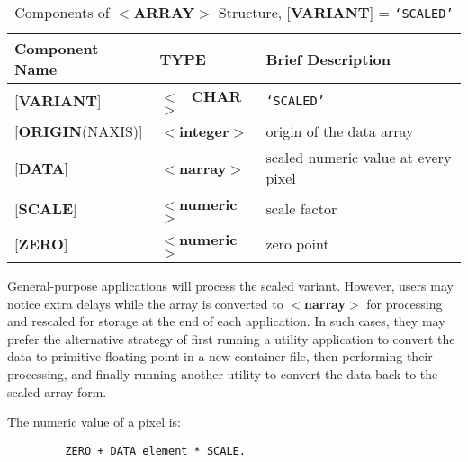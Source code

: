 \begin{table}[htb]
\centering
\caption{Components of $<${\bf ARRAY}$>$ Structure, {[}{\bf VARIANT}{]} = {\tt `SCALED'}}
\begin{tabular}{|l|l|l|}
\hline
Component Name & TYPE & Brief Description \\ \hline
{[}{\bf VARIANT}{]} & $<${\bf \_CHAR}$>$ & {\tt `SCALED'} \\
{[}{\bf ORIGIN}(NAXIS){]} & $<${\bf integer}$>$ & origin of the data array \\
{[}{\bf DATA}{]} & $<${\bf narray}$>$ & scaled numeric value at every pixel \\
{[}{\bf SCALE}{]} & $<${\bf numeric}$>$ & scale factor \\
{[}{\bf ZERO}{]} & $<${\bf numeric}$>$ & zero point \\ \hline
\end{tabular}
\end{table}

General-purpose applications will process the scaled variant.
However, users may notice extra delays
while the array is converted to
$<${\bf narray}$>$ for processing
and rescaled for storage at the end of each application.  In such cases,
they may prefer the
alternative strategy of first running a utility application
to convert the data to primitive floating point in a new
container file, then performing their processing, and
finally running another utility to convert
the data back to the scaled-array
form.

The numeric value of a pixel is:
\begin{verbatim}
         ZERO + DATA element * SCALE.
\end{verbatim}

